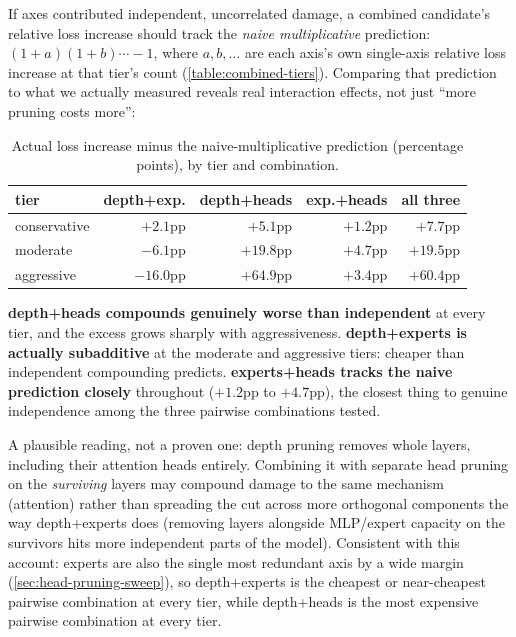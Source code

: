 \documentclass{article}
\theoremstyle{plain}
\theoremstyle{definition}
\theoremstyle{remark}
\begin{document}
If axes contributed independent, uncorrelated damage, a combined
candidate's relative loss increase should track the \emph{naive
multiplicative} prediction: $(1+a)(1+b)\cdots - 1$, where $a, b, \ldots$
are each axis's own single-axis relative loss increase at that tier's
count (\cref{table:combined-tiers}). Comparing that prediction to what we
actually measured reveals real interaction effects, not just ``more
pruning costs more'':

\begin{table}[t]
\centering
\scriptsize
\setlength{\tabcolsep}{3pt}
\begin{tabular}{lrrrr}
\toprule
tier & depth+exp. & depth+heads & exp.+heads & all three \\
\midrule
conservative & $+2.1$pp & $+5.1$pp & $+1.2$pp & $+7.7$pp \\
moderate & $-6.1$pp & $+19.8$pp & $+4.7$pp & $+19.5$pp \\
aggressive & $-16.0$pp & $+64.9$pp & $+3.4$pp & $+60.4$pp \\
\bottomrule
\end{tabular}
\caption{Actual loss increase minus the naive-multiplicative prediction
(percentage points), by tier and combination.}
\label{table:combined-excess}
\end{table}

\textbf{depth+heads compounds genuinely worse than independent} at every
tier, and the excess grows sharply with aggressiveness. \textbf{depth+experts
is actually subadditive} at the moderate and aggressive tiers: cheaper
than independent compounding predicts. \textbf{experts+heads tracks the
naive prediction closely} throughout ($+1.2$pp to $+4.7$pp), the closest
thing to genuine independence among the three pairwise combinations
tested.

A plausible reading, not a proven one: depth pruning removes whole
layers, including their attention heads entirely. Combining it with
separate head pruning on the \emph{surviving} layers may compound damage
to the same mechanism (attention) rather than spreading the cut across
more orthogonal components the way depth+experts does (removing layers
alongside MLP/expert capacity on the survivors hits more independent
parts of the model). Consistent with this account: experts are also the
single most redundant axis by a wide margin
(\cref{sec:head-pruning-sweep}), so depth+experts is the cheapest or
near-cheapest pairwise combination at every tier, while depth+heads is
the most expensive pairwise combination at every tier.
\end{document}
